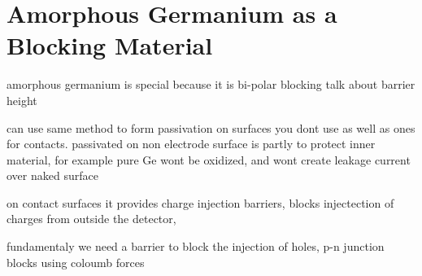 \chapter{Amorphous Germanium as a Blocking Material}
amorphous germanium is special because it is bi-polar blocking
talk about barrier height

can use same method to form passivation on surfaces you dont use as well as ones for contacts.
passivated on non electrode surface is partly to protect inner material, for example pure Ge wont be oxidized, and wont create leakage current over naked surface

on contact surfaces it provides charge injection barriers, blocks injectection of charges from outside the detector, 

fundamentaly we need a barrier to block the injection of holes, p-n junction blocks using coloumb forces



